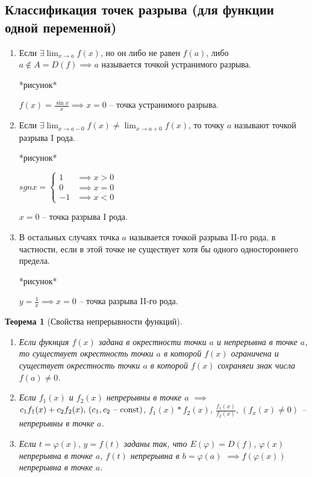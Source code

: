 \documentclass[a4paper,oneside]{article}
\newcommand{\dslim}{\displaystyle\lim}
\newtheorem{theorem}{Теорема}[subsection]
\theoremstyle{definition}
\theoremstyle{definition}
\theoremstyle{definition}
\begin{document}
\subsection{Классификация точек разрыва (для функции одной переменной)}

\begin{enumerate}
    \item
        Если $\exists \dslim_{x \to a} f(x)$, но он либо не равен $f(a)$, либо
        $a \notin A = D(f) \implies a$ называется точкой устранимого разрыва.

        *рисунок*

        $f(x) = \frac{\sin x}{x} \implies x = 0$ -- точка устранимого разрыва.

    \item 
        Если $\exists \dslim_{x \to a - 0} f(x) \ne \dslim_{x \to a + 0} f(x)$, то
        точку $a$ называют точкой разрыва I рода.

        *рисунок*

        $sgn x = \begin{cases}
            1  &\implies x > 0 \\
            0  &\implies x = 0 \\
            -1 &\implies x < 0
        \end{cases}$

        $x = 0$ -- точка разрыва I рода.
    
    \item
        В остальных случаях точка $a$ называется точкой разрыва II-го рода, в частности,
        если в этой точке не существует хотя бы одного одностороннего предела.

        *рисунок*

        $y = \frac{1}{x} \implies x = 0$ -- точка разрыва II-го рода.
\end{enumerate}

\begin{theorem}[Свойства непрерывности функций]
    \begin{enumerate}
        \item 
            Если фукнция $f(x)$ задана в окрестности точки $a$ и непрерывна в точке $a$,
            то существует окрестность точки $a$ в которой $f(x)$ ограничена и существует
            окрестность точки $a$ в которой $f(x)$ сохраняеи знак числа $f(a) \ne 0$.
        
        \item 
            Если $f_1(x)$ и $f_2(x)$ непрерывны в точке $a$ $\implies$
            $c_1 f_1(x) + c_2 f_2(x), \, (c_1, c_2 \textnormal{ -- const})$,
            $f_1(x) * f_2(x)$, $\frac{f_1(x)}{f_2(x)}, \, (f_x(x) \ne 0)$ -- непрерывны в точке $a$.
        
        \item
            Если $t = \varphi(x), \, y = f(t)$ заданы так, что $E(\varphi) = D(f)$,
            $\varphi(x)$ непрерывна в точке $a$, $f(t)$ непрерывна в $b = \varphi(a)$
            $\implies f(\varphi(x))$ непрерывна в точке $a$.
    \end{enumerate}
\end{theorem}
\end{document}
